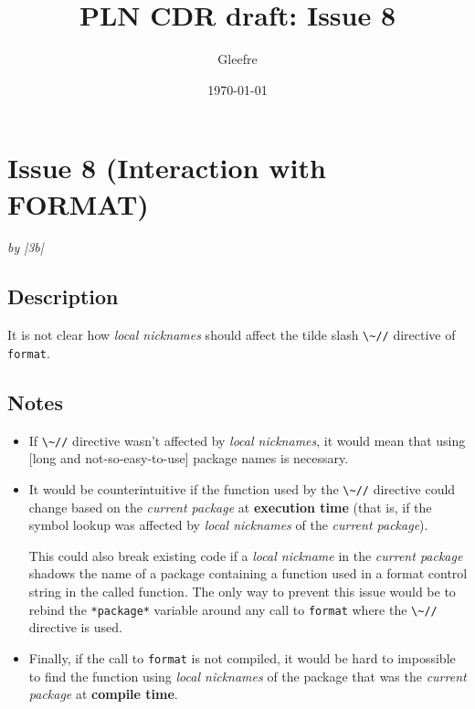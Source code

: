 \documentclass[11pt]{article}
\author{Gleefre}
\date{\today}
\title{PLN CDR draft: Issue 8}
\begin{document}
\maketitle

\section{Issue 8 (Interaction with FORMAT)}
\label{sec:org0662517}
\emph{by |3b|}
\subsection{Description}
\label{sec:org603741c}
It is not clear how \emph{local nicknames} should affect the tilde slash \texttt{\textbackslash{}\textasciitilde{}//}
directive of \texttt{format}.
\subsection{Notes}
\label{sec:org134f5f7}
\begin{itemize}
\item If \texttt{\textbackslash{}\textasciitilde{}//} directive wasn't affected by \emph{local nicknames}, it would mean that
using [long and not-so-easy-to-use] package names is necessary.

\item It would be counterintuitive if the function used by the \texttt{\textbackslash{}\textasciitilde{}//} directive could
change based on the \emph{current package} at \textbf{execution time} (that is, if the
symbol lookup was affected by \emph{local nicknames} of the \emph{current package}).

This could also break existing code if a \emph{local nickname} in the \emph{current
package} shadows the name of a package containing a function used in a format
control string in the called function. The only way to prevent this issue would
be to rebind the \texttt{*package*} variable around any call to \texttt{format} where the
\texttt{\textbackslash{}\textasciitilde{}//} directive is used.

\item Finally, if the call to \texttt{format} is not compiled, it would be hard to impossible
to find the function using \emph{local nicknames} of the package that was the
\emph{current package} at \textbf{compile time}.
\end{itemize}
\end{document}
